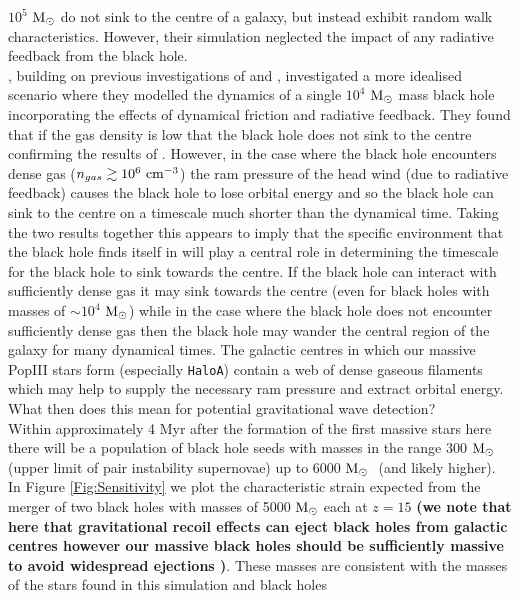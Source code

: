 \documentclass[twocolumn,iop,revtex4]{openjournal}
\newcommand{\msolar} {$\rm{M_{\odot}}~$}
\newcommand{\msolarc} {$\rm{M_{\odot}}$}
\newcommand{\hac} {\texttt{HaloA}}
\begin{document}
$10^5$ \msolar do not sink to the centre of a galaxy, but instead exhibit random walk characteristics.
However, their simulation neglected the impact of any radiative feedback from the black hole.\\
\indent \cite{Toyouchi_2020}, building on previous investigations of \cite{Park_2017} and \cite{Park_2019}, investigated a more idealised scenario where they modelled the
dynamics of a single $10^4$ \msolar mass black hole incorporating the effects of dynamical friction
and radiative feedback. They found that if the gas density is low that the black hole
does not sink to the centre confirming the results of \cite{Pfister_2019}. However, in the case where
the black hole encounters dense gas ($n_{gas} \gtrsim 10^6 \ \rm{cm}^{-3}$) the ram pressure of the head wind (due to radiative feedback)
causes the black hole to lose orbital energy and so the black hole can sink to the centre on a
timescale much shorter than the dynamical time. Taking the two results together this
appears to imply that the specific environment that the black hole finds
itself in will play a central role in determining the timescale for the black hole
to sink towards the centre. If the black hole can interact with sufficiently dense gas it may
sink towards the centre (even for black holes with masses of $\sim 10^4$ \msolarc) while in
the case where the black hole does not encounter sufficiently dense gas then the black hole
may wander the central region of the galaxy for many dynamical times. The galactic centres
in which our massive PopIII
stars form (especially \hac) contain a web of dense gaseous filaments which may help to supply
the necessary ram pressure and extract orbital energy. 
What then does this mean for potential gravitational wave detection?\\
\indent Within approximately 4 Myr after the formation of the first massive stars here there
will be a population of black hole seeds with masses in the range 300 \msolar (upper limit of pair
instability supernovae) up to 6000 \msolar
(and likely higher). In Figure \ref{Fig:Sensitivity} we plot the characteristic strain
expected from the merger of two black holes with masses of 5000 \msolar each at $z = 15$ \textbf{(we note that here that gravitational recoil effects can eject black holes from galactic centres \citep[e.g.][]{Gultekin_2006} however our massive black holes should be sufficiently massive to avoid widespread ejections \citep{Holley-Bockelmann_2008})}.
These masses are consistent with the masses of the stars found in this simulation and black holes
\end{document}
